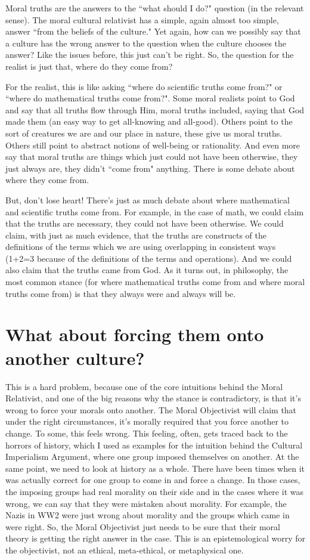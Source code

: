 Moral truths are the answers to the ``what should I do?" question (in the relevant sense). The moral cultural relativist has a simple, again almost too simple, answer ``from the beliefs of the culture." Yet again, how can we possibly say that a culture has the wrong answer to the question when the culture chooses the answer? Like the issues before, this just can't be right. So, the question for the realist is just that, where do they come from? 

For the realist, this is like asking ``where do scientific truths come from?" or ``where do mathematical truths come from?". Some moral realists point to God and say that all truths flow through Him, moral truths included, saying that God made them (an easy way to get all-knowing and all-good). Others point to the sort of creatures we are and our place in nature, these give us moral truths. Others still point to abstract notions of well-being or rationality.  And even more say that moral truths are things which just could not have been otherwise, they just always are, they didn't ``come from" anything. There is some debate about where they come from.

But, don't lose heart! There's just as much debate about where mathematical and scientific truths come from. For example, in the case of math, we could claim that the truths are necessary, they could not have been otherwise. We could claim, with just as much evidence, that the truths are constructs of the definitions of the terms which we are using overlapping in consistent ways (1+2=3 because of the definitions of the terms and operations). And we could also claim that the truths came from God.  As it turns out, in philosophy, the most common stance (for where mathematical truths come from and where moral truths come from) is that they always were and always will be.

\section{What about forcing them onto another culture?}

This is a hard problem, because one of the core intuitions behind the Moral Relativist, and one of the big reasons why the stance is contradictory, is that it’s wrong to force your morals onto another. The Moral Objectivist will claim that under the right circumstances, it’s morally required that you force another to change. To some, this feels wrong. This feeling, often, gets traced back to the horrors of history, which I used as examples for the intuition behind the Cultural Imperialism Argument, where one group imposed themselves on another. At the same point, we need to look at history as a whole. There have been times when it was actually correct for one group to come in and force a change. In those cases, the imposing groups had real morality on their side and in the cases where it was wrong, we can say that they were mistaken about morality. For example, the Nazis in WW2 were just wrong about morality and the groups which came in were right. So, the Moral Objectivist just needs to be sure that their moral theory is getting the right answer in the case. This is an epistemological worry for the objectivist, not an ethical, meta-ethical, or metaphysical one. 

